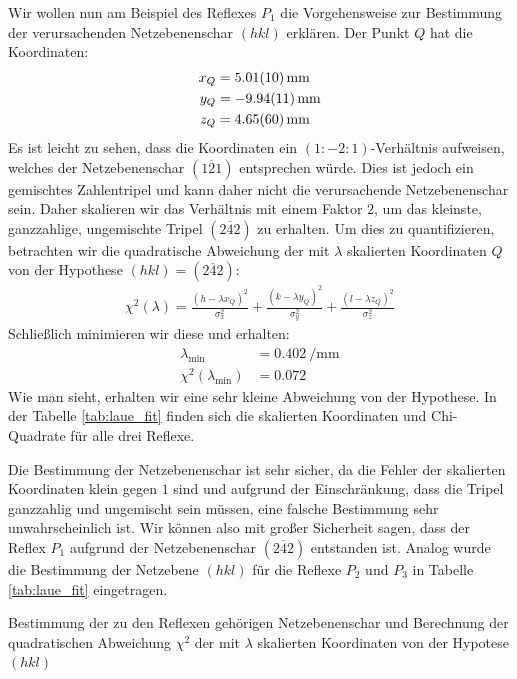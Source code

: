\documentclass[11pt, a4paper]{article}
\begin{document}
Wir wollen nun am Beispiel des Reflexes $P_1$ die Vorgehensweise zur Bestimmung der verursachenden Netzebenenschar $(hkl)$ erklären.
Der Punkt $Q$ hat die Koordinaten:
\begin{align*}
  x_Q &= \SI{5.01 +- 0.10}{\milli\metre} \\
  y_Q &= \SI{-9.94 +- 0.11}{\milli\metre} \\
  z_Q &= \SI{4.65 +- 0.60}{\milli\metre}
\end{align*}
Es ist leicht zu sehen, dass die Koordinaten ein $(1:-2:1)$-Verhältnis aufweisen, welches der Netzebenenschar $(1\overline{2}1)$ entsprechen würde.
Dies ist jedoch ein gemischtes Zahlentripel und kann daher nicht die verursachende Netzebenenschar sein.
Daher skalieren wir das Verhältnis mit einem Faktor $2$, um das kleinste, ganzzahlige, ungemischte Tripel $(2\overline{4}2)$ zu erhalten.
Um dies zu quantifizieren, betrachten wir die quadratische Abweichung der mit $\lambda$ skalierten Koordinaten $Q$ von der Hypothese $(hkl) = (2\overline{4}2)$:
\begin{align}
  \chi^2(\lambda) = \frac{(h-\lambda x_Q)^2}{\sigma_x^2} + \frac{(k-\lambda y_Q)^2}{\sigma_y^2} + \frac{(l-\lambda z_Q)^2}{\sigma_z^2}
\end{align}
Schließlich minimieren wir diese und erhalten:
\begin{align*}
  \lambda_\mathrm{min} &= \SI{0,402}{\per\milli\metre} \\
  \chi^2(\lambda_\mathrm{min}) &= \num{0,072}
\end{align*}
Wie man sieht, erhalten wir eine sehr kleine Abweichung von der Hypothese. In der Tabelle \ref{tab:laue_fit} finden sich die skalierten Koordinaten und Chi-Quadrate für alle drei Reflexe.

Die Bestimmung der Netzebenenschar ist sehr sicher, da die Fehler der skalierten Koordinaten klein gegen $1$ sind und aufgrund der Einschränkung, dass die Tripel ganzzahlig und ungemischt sein müssen, eine falsche Bestimmung sehr unwahrscheinlich ist.
Wir können also mit großer Sicherheit sagen, dass der Reflex $P_1$ aufgrund der Netzebenenschar $(2\overline{4}2)$ entstanden ist.
Analog wurde die Bestimmung der Netzebene $(hkl)$ für die Reflexe $P_2$ und $P_3$ in Tabelle \ref{tab:laue_fit} eingetragen.
\begin{table}[h]
\centering
\resizebox{\columnwidth}{!}{%
}
\caption{Bestimmung der zu den Reflexen gehörigen Netzebenenschar und Berechnung der quadratischen Abweichung $\chi^2$ der mit $\lambda$ skalierten Koordinaten von der Hypotese $(hkl)$}
\label{tab:laue_fit}
\end{table}
\end{document}
